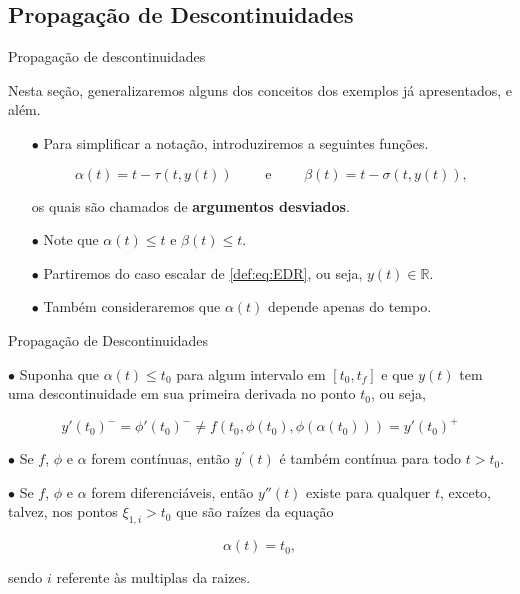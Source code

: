 \documentclass{beamer}
\newcommand{\R}{\mathbb{R}}
\theoremstyle{plain}
\theoremstyle{definition}
\begin{document}
\subsection{Propagação de Descontinuidades}
\begin{frame}{Propagação de descontinuidades}

    Nesta seção, generalizaremos alguns dos conceitos dos exemplos já apresentados, e além.

    \begin{itemize}

        \item[$\bullet$] Para simplificar a notação, introduziremos a seguintes funções.

            \[
                \alpha(t)=t-\tau(t, y(t)) \qquad \text{ e } \qquad \beta(t)=t-\sigma(t, y(t)),
            \]

        \noindent
        os quais são chamados de \textbf{argumentos desviados}. 

        \item[$\bullet$] Note que $\alpha(t) \leq t$ e $\beta(t) \leq t$.

        \item[$\bullet$] Partiremos do caso escalar de \eqref{def:eq:EDR}, ou seja, $y(t) \in \R$.

        \item[$\bullet$] Também consideraremos que $\alpha(t)$ depende apenas do tempo.

    \end{itemize}
         

\end{frame}



\begin{frame}{Propagação de Descontinuidades}
    


    $\bullet$ Suponha que $\alpha(t) \leq t_0$ para algum intervalo em $[t_0, t_f]$ e que $y(t)$ tem uma descontinuidade em sua primeira derivada no ponto $t_0$, ou seja, 

    \[
        y'(t_0)^- = \phi'(t_0)^- \neq f(t_0, \phi(t_0), \phi(\alpha(t_0))) = y'(t_0)^+
    \]

    $\bullet$ Se \(f\), \(\phi\) e \(\alpha\) forem contínuas, então  \(y^{\prime}(t)\) é também contínua para todo \(t>t_{0}\). 
    
    $\bullet$ Se \(f\), \(\phi\) e \(\alpha\) forem diferenciáveis, então \(y''(t)\) existe para qualquer \(t\), exceto, talvez, nos pontos \(\xi_{1, i} >t_{0}\) que são raízes da equação


    \[
        \alpha(t)=t_{0},
    \]

    sendo $i$ referente às multiplas da raizes.

\end{frame}
\end{document}
